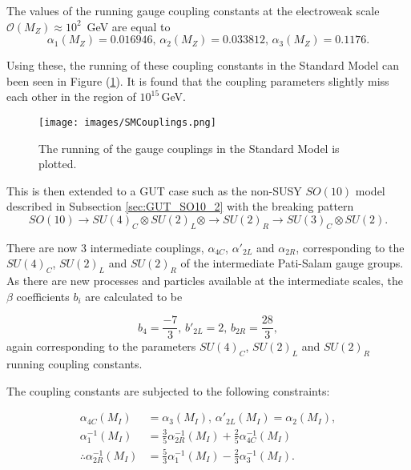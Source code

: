 \documentclass{article}
\begin{document}
The values of the running gauge coupling constants at the electroweak scale $\mathcal{O}(M_Z)\approx10^2\,$ GeV are equal to 
\begin{equation}
\alpha_1(M_Z) = 0.016946,\,\alpha_2(M_Z)=0.033812,\,\alpha_3(M_Z) = 0.1176.
\end{equation}

Using these, the running of these coupling constants in the Standard Model can been seen in Figure (\ref{fig:SMCoupling}). It is found that the coupling parameters slightly miss each other in the region of $10^{15}\,$GeV.

\begin{figure}
    \centering
    \texttt{[image: images/SMCouplings.png]}
    \caption{The running of the gauge couplings in the Standard Model is plotted.\label{fig:SMCoupling}}
\end{figure}

This is then extended to a GUT case such as the non-SUSY $SO(10)$ model described in Subsection \ref{sec:GUT_SO10_2} with the breaking pattern 
\begin{equation}
SO(10)\rightarrow SU(4)_C \otimes SU(2)_L \otimes \rightarrow SU(2)_R \rightarrow SU(3)_C \otimes SU(2).
\end{equation}

There are now 3 intermediate couplings, $\alpha_{4C}$, $\alpha'_{2L}$ and $\alpha_{2R}$, corresponding to the $SU(4)_C$, $SU(2)_L$ and $SU(2)_R$ of the intermediate Pati-Salam gauge groups. As there are new processes and particles available at the intermediate scales, the $\beta$ coefficients $b_i$ are calculated to be

\begin{equation}
b_4 = \frac{-7}{3},\,b'_{2L} = 2,\,b_{2R} = \frac{28}{3},
\end{equation}
again corresponding to the parameters $SU(4)_C$, $SU(2)_L$ and $SU(2)_R$ running coupling constants.

The coupling constants are subjected to the following constraints:

\begin{equation}
\begin{split}
\alpha_{4C}(M_I) & = \alpha_{3}(M_I),\,\alpha'_{2L}(M_I) = \alpha_{2}(M_I),\\
\alpha^{-1}_1(M_I) & = \frac{3}{5}\alpha^{-1}_{2R}(M_I) + \frac{2}{5}\alpha^{-1}_{4C}(M_I)\\
\therefore \alpha^{-1}_{2R}(M_I) &= \frac{5}{3}\alpha^{-1}_1(M_I) - \frac{2}{3}\alpha^{-1}_{3}(M_I).
\end{split}
\end{equation}
\end{document}
